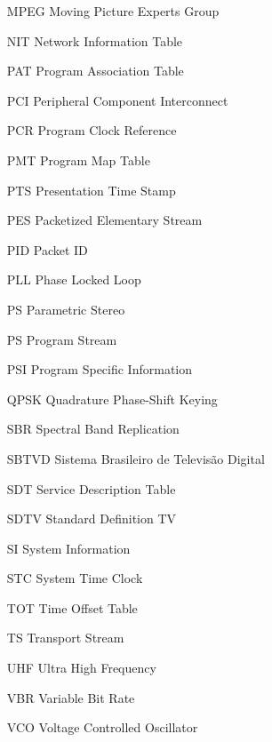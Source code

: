 \documentclass[12pt,a4paper]{article}
\begin{document}
\begin{itemize}
  \item[MPEG] Moving Picture Experts Group
  \item[NIT] Network Information Table
  \item[PAT] Program Association Table
  \item[PCI] Peripheral Component Interconnect
  \item[PCR] Program Clock Reference
  \item[PMT] Program Map Table
  \item[PTS] Presentation Time Stamp
  \item[PES] Packetized Elementary Stream
  \item[PID] Packet ID
  \item[PLL] Phase Locked Loop
  \item[PS] Parametric Stereo
  \item[PS] Program Stream
  \item[PSI] Program Specific Information
  \item[QPSK] Quadrature Phase-Shift Keying
  \item[SBR] Spectral Band Replication
  \item[SBTVD] Sistema Brasileiro de Televisão Digital
  \item[SDT] Service Description Table
  \item[SDTV] Standard Definition TV
  \item[SI] System Information
  \item[STC] System Time Clock
  \item[TOT] Time Offset Table
  \item[TS] Transport Stream
  \item[UHF] Ultra High Frequency
  \item[VBR] Variable Bit Rate
  \item[VCO] Voltage Controlled Oscillator
\end{itemize}


\TBcoverpage
\end{document}
